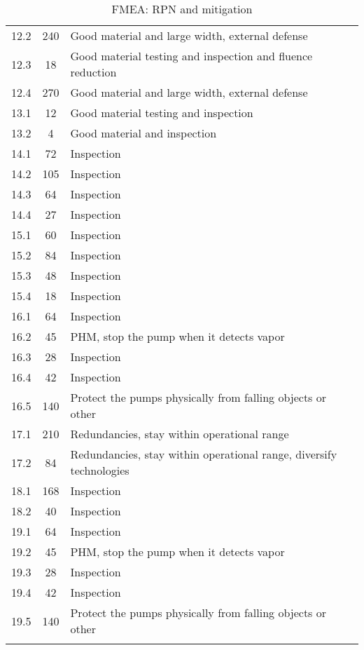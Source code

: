 \begin{longtable}{ccp{10cm}}
    12.2 & 240 & Good material and large width, external defense \\
    12.3 & 18  & Good material testing and inspection and fluence reduction \\
    12.4 & 270 & Good material and large width, external defense \\
    13.1 & 12  & Good material testing and inspection \\
    13.2 & 4   & Good material and inspection \\
    14.1 & 72  & Inspection \\
    14.2 & 105  & Inspection \\
    14.3 & 64  & Inspection \\
    14.4 & 27  & Inspection \\
    15.1 & 60  & Inspection \\
    15.2 & 84  & Inspection \\
    15.3 & 48  & Inspection \\
    15.4 & 18  & Inspection \\
    16.1 & 64  & Inspection \\
    16.2 & 45  & PHM, stop the pump when it detects vapor \\
    16.3 & 28  & Inspection \\
    16.4 & 42  & Inspection \\
    16.5 & 140  & Protect the pumps physically from falling objects or other \\
    17.1 & 210  & Redundancies, stay within operational range \\
    17.2 & 84  & Redundancies, stay within operational range, diversify technologies \\
    18.1 & 168  & Inspection \\
    18.2 & 40  & Inspection \\
    19.1 & 64  & Inspection \\
    19.2 & 45  & PHM, stop the pump when it detects vapor \\
    19.3 & 28  & Inspection \\
    19.4 & 42  & Inspection \\
    19.5 & 140  & Protect the pumps physically from falling objects or other \\
    \caption{FMEA: RPN and mitigation}\label{tab:fmea_rpn_risk}
\end{longtable}






\
